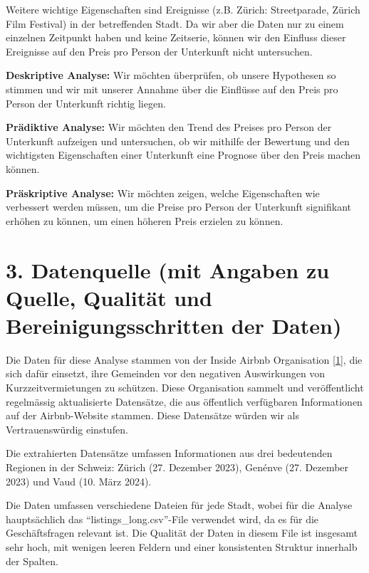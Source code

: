 \documentclass[
  journal,
]{IEEEtran}%
\begin{document}
Weitere wichtige Eigenschaften sind Ereignisse (z.B. Zürich:
Streetparade, Zürich Film Festival) in der betreffenden Stadt. Da wir
aber die Daten nur zu einem einzelnen Zeitpunkt haben und keine
Zeitserie, können wir den Einfluss dieser Ereignisse auf den Preis pro
Person der Unterkunft nicht untersuchen.

\textbf{Deskriptive Analyse:} Wir möchten überprüfen, ob unsere
Hypothesen so stimmen und wir mit unserer Annahme über die Einflüsse auf
den Preis pro Person der Unterkunft richtig liegen.

\textbf{Prädiktive Analyse:} Wir möchten den Trend des Preises pro
Person der Unterkunft aufzeigen und untersuchen, ob wir mithilfe der
Bewertung und den wichtigsten Eigenschaften einer Unterkunft eine
Prognose über den Preis machen können.

\textbf{Präskriptive Analyse:} Wir möchten zeigen, welche Eigenschaften
wie verbessert werden müssen, um die Preise pro Person der Unterkunft
signifikant erhöhen zu können, um einen höheren Preis erzielen zu
können.

\hypertarget{datenquelle-mit-angaben-zu-quelle-qualituxe4t-und-bereinigungsschritten-der-daten}{%
\section{3. Datenquelle (mit Angaben zu Quelle, Qualität und
Bereinigungsschritten der
Daten)}\label{datenquelle-mit-angaben-zu-quelle-qualituxe4t-und-bereinigungsschritten-der-daten}}

Die Daten für diese Analyse stammen von der Inside Airbnb Organisation
\protect\hyperlink{ref-inside-airbnb-2023}{{[}1{]}}, die sich dafür
einsetzt, ihre Gemeinden vor den negativen Auswirkungen von
Kurzzeitvermietungen zu schützen. Diese Organisation sammelt und
veröffentlicht regelmässig aktualisierte Datensätze, die aus öffentlich
verfügbaren Informationen auf der Airbnb-Website stammen. Diese
Datensätze würden wir als Vertrauenswürdig einstufen.

Die extrahierten Datensätze umfassen Informationen aus drei bedeutenden
Regionen in der Schweiz: Zürich (27. Dezember 2023), Genénve (27.
Dezember 2023) und Vaud (10. März 2024).

Die Daten umfassen verschiedene Dateien für jede Stadt, wobei für die
Analyse hauptsächlich das ``listings\_long.csv''-File verwendet wird, da
es für die Geschäftsfragen relevant ist. Die Qualität der Daten in
diesem File ist insgesamt sehr hoch, mit wenigen leeren Feldern und
einer konsistenten Struktur innerhalb der Spalten.
\end{document}
